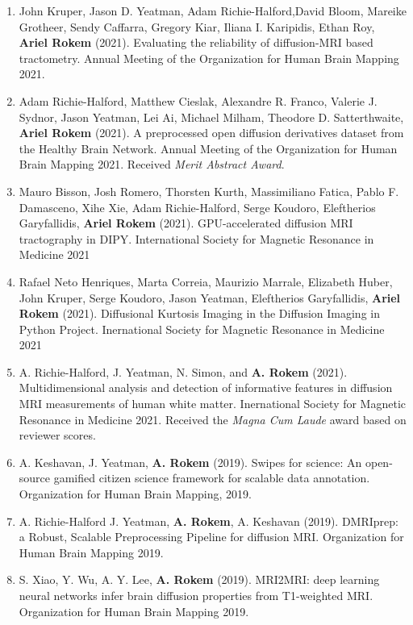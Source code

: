 \documentclass[11pt,fullpage]{article}
\begin{document}
\begin{enumerate}
\item John Kruper, Jason D. Yeatman, Adam Richie-Halford,David Bloom, Mareike Grotheer, Sendy Caffarra, Gregory Kiar, Iliana I. Karipidis, Ethan Roy, {\bf Ariel Rokem} (2021). Evaluating the reliability of diffusion-MRI based tractometry. Annual Meeting of the Organization for Human Brain Mapping 2021.

\item Adam Richie-Halford, Matthew Cieslak, Alexandre R. Franco, Valerie J. Sydnor, Jason Yeatman, Lei Ai, Michael Milham, Theodore D. Satterthwaite, {\bf Ariel Rokem} (2021). A preprocessed open diffusion derivatives dataset from the Healthy Brain Network. Annual Meeting of the Organization for Human Brain Mapping 2021. Received \emph{Merit Abstract Award}.

\item Mauro Bisson, Josh Romero, Thorsten Kurth, Massimiliano Fatica, Pablo F. Damasceno, Xihe Xie, Adam Richie-Halford, Serge Koudoro, Eleftherios Garyfallidis, {\bf Ariel Rokem} (2021). GPU-accelerated diffusion MRI tractography in DIPY. International Society for Magnetic Resonance in Medicine 2021

\item Rafael Neto Henriques, Marta Correia, Maurizio Marrale, Elizabeth Huber, John Kruper, Serge Koudoro, Jason Yeatman, Eleftherios Garyfallidis, {\bf Ariel Rokem} (2021). Diffusional Kurtosis Imaging in the Diffusion Imaging in Python Project. Inernational Society for Magnetic Resonance in Medicine 2021

\item A. Richie-Halford, J. Yeatman, N. Simon, and {\bf A. Rokem} (2021). Multidimensional analysis and detection of informative features in diffusion MRI measurements of human white matter. Inernational Society for Magnetic Resonance in Medicine 2021. Received the \emph{Magna Cum Laude} award based on reviewer scores.

\item A. Keshavan, J. Yeatman, {\bf A. Rokem} (2019). Swipes for science: An
open-source gamified citizen science framework for scalable data annotation.
Organization for Human Brain Mapping, 2019.

\item A. Richie-Halford J. Yeatman, {\bf A. Rokem}, A. Keshavan (2019).
DMRIprep: a Robust, Scalable Preprocessing Pipeline for diffusion MRI.
Organization for Human Brain Mapping 2019.

\item S. Xiao, Y. Wu, A. Y. Lee, {\bf A. Rokem} (2019). MRI2MRI: deep learning
neural networks infer brain diffusion properties from T1-weighted MRI. Organization for Human Brain Mapping 2019.


\end{enumerate}
\end{document}

